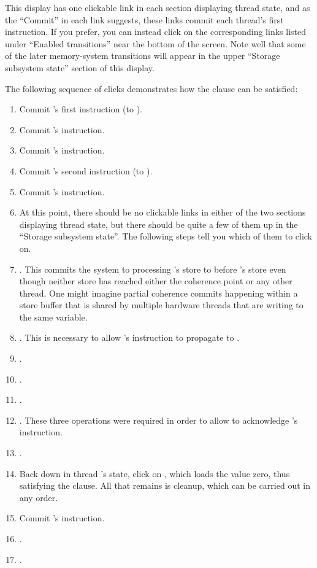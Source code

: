 This display has one clickable link in each section displaying thread
state, and as the ``Commit'' in each link suggests, these links commit
each thread's first  instruction.
If you prefer, you can instead click on the corresponding links listed
under ``Enabled transitions'' near the bottom of the screen.
Note well that some of the later memory-system transitions will appear
in the upper ``Storage subsystem state'' section of this display.

The following sequence of clicks demonstrates how the  clause
can be satisfied:

\begin{enumerate}
\item	Commit 's first  instruction (to ).
\item	Commit 's  instruction.
\item	Commit 's  instruction.
\item	Commit 's second  instruction (to ).
\item	Commit 's  instruction.
\item	At this point, there should be no clickable links in either of
	the two sections displaying thread state, but there should be
	quite a few of them up in the ``Storage subsystem state''.
	The following steps tell you which of them to click on.
\item	{}.
	This commits the system to processing 's store to
	 before 's store even though neither store
	has reached either the coherence point or any other thread.
	One might imagine partial coherence commits happening within a
	store buffer that is shared by multiple hardware threads
	that are writing to the same variable.
\item	{}.
	This is necessary to allow 's  instruction
	to propagate to .
\item	{}.
\item	{}.
\item	{}.
\item	{}.
	These three operations were required in order to allow 
	to acknowledge 's  instruction.
\item	{}.
\item	Back down in thread 's state, click on , which loads the value zero, thus satisfying the 
	clause.
	All that remains is cleanup, which can be carried out in any order.
\item	Commit 's  instruction.
\item	{}.
\item	{}.
\end{enumerate}

